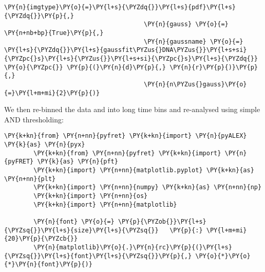 \begin{Verbatim}[commandchars=\\\{\}, fontsize=\scriptsize]
                                      \PY{n}{imgtype}\PY{o}{=}\PY{l+s}{\PYZdq{}}\PY{l+s}{pdf}\PY{l+s}{\PYZdq{}}\PY{p}{,} 
                                      \PY{n}{gauss} \PY{o}{=} \PY{n+nb+bp}{True}\PY{p}{,} 
                                      \PY{n}{gaussname} \PY{o}{=} \PY{l+s}{\PYZdq{}}\PY{l+s}{gaussfit\PYZus{}DNA\PYZus{}}\PY{l+s+si}{\PYZpc{}s}\PY{l+s}{\PYZus{}}\PY{l+s+si}{\PYZpc{}s}\PY{l+s}{\PYZdq{}} \PY{o}{\PYZpc{}} \PY{p}{(}\PY{n}{d}\PY{p}{,} \PY{n}{r}\PY{p}{)}\PY{p}{,} 
                                      \PY{n}{n\PYZus{}gauss}\PY{o}{=}\PY{l+m+mi}{2}\PY{p}{)}
\end{Verbatim}

We then re-binned the data and into long time bins and re-analysed using simple AND thresholding:

\begin{Verbatim}[commandchars=\\\{\}, fontsize=\scriptsize]
        \PY{k+kn}{from} \PY{n+nn}{pyfret} \PY{k+kn}{import} \PY{n}{pyALEX} \PY{k}{as} \PY{n}{pyx}
        \PY{k+kn}{from} \PY{n+nn}{pyfret} \PY{k+kn}{import} \PY{n}{pyFRET} \PY{k}{as} \PY{n}{pft}
        \PY{k+kn}{import} \PY{n+nn}{matplotlib.pyplot} \PY{k+kn}{as} \PY{n+nn}{plt}
        \PY{k+kn}{import} \PY{n+nn}{numpy} \PY{k+kn}{as} \PY{n+nn}{np}
        \PY{k+kn}{import} \PY{n+nn}{os}
        \PY{k+kn}{import} \PY{n+nn}{matplotlib}
        
        \PY{n}{font} \PY{o}{=} \PY{p}{\PYZob{}}\PY{l+s}{\PYZsq{}}\PY{l+s}{size}\PY{l+s}{\PYZsq{}}   \PY{p}{:} \PY{l+m+mi}{20}\PY{p}{\PYZcb{}}
        \PY{n}{matplotlib}\PY{o}{.}\PY{n}{rc}\PY{p}{(}\PY{l+s}{\PYZsq{}}\PY{l+s}{font}\PY{l+s}{\PYZsq{}}\PY{p}{,} \PY{o}{*}\PY{o}{*}\PY{n}{font}\PY{p}{)}


\end{Verbatim}
